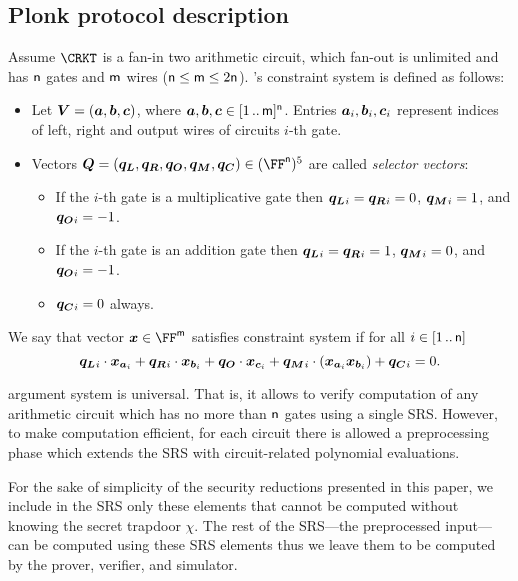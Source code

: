 \subsection{Plonk protocol description}
\label{sec:plonk_explained}
Assume $\CRKT$ is a fan-in two arithmetic circuit,
which fan-out is unlimited and has $\mathsf{n}$ gates and $\mathsf{m}$ wires
($\mathsf{n} \leq \mathsf{m} \leq 2\mathsf{n}$). \plonk's constraint
system is defined as follows:
\begin{itemize}
\item Let $\vec{V} = (\va, \vb, \vc)$, where $\va, \vb, \vc
  \in \range{1}{\noofw}^\numberofconstrains$. Entries $\va_i, \vb_i, \vc_i$ represent indices of left,
  right and output wires of circuits $i$-th gate.
\item Vectors $\vec{Q} = (\vql, \vqr, \vqo, \vqm, \vqc) \in
  (\FF^\numberofconstrains)^5$ are called \emph{selector vectors}:
  \begin{itemize}
  \item If the $i$-th gate is a multiplicative gate then $\vql_i = \vqr_i = 0$,
    $\vqm_i = 1$, and $\vqo_i = -1$. 
  \item If the $i$-th gate is an addition gate then $\vql_i = \vqr_i  = 1$, $\vqm_i =
    0$, and $\vqo_i = -1$. 
  \item $\vqc_i = 0$ always. 
  \end{itemize}
\end{itemize}

We say that vector $\vx \in \FF^\noofw$ satisfies constraint system if for all $i
\in [1 \, .. \, \mathsf{n}]$
\[
  \vql_i \cdot \vx_{\va_i} + \vqr_i \cdot \vx_{\vb_i} + \vqo \cdot \vx_{\vc_i} +
  \vqm_i \cdot (\vx_{\va_i} \vx_{\vb_i}) + \vqc_i = 0. 
\]

\label{sec:plonk_explained}
\plonk{} argument system is universal. That is, it allows to verify computation
of any arithmetic circuit which has no more than $\mathsf{n}$
gates using a single SRS. However, to make computation efficient, for each
circuit there is allowed a preprocessing phase which extends the SRS with
circuit-related polynomial evaluations.

For the sake of simplicity of the security reductions presented in this paper, we
include in the SRS only these elements that cannot be computed without knowing
the secret trapdoor $\chi$. The rest of the SRS---the preprocessed input---can
be computed using these SRS elements thus we leave them to be computed by the
prover, verifier, and simulator.

